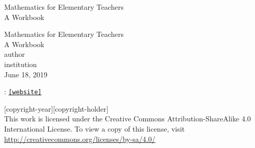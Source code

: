 \documentclass[twoside,11pt,]{book}
\newcommand{\mono}[1]{\texttt{#1}}
\begin{document}
\frontmatter
\thispagestyle{empty}
{\centering
\vspace*{0.28\textheight}
{\Huge Mathematics for Elementary Teachers}\\[2\baselineskip]
{\LARGE A Workbook}\\
}
\clearpage
\thispagestyle{empty}
\null%
\clearpage
\thispagestyle{empty}
{\centering
\vspace*{0.14\textheight}
{\Huge Mathematics for Elementary Teachers}\\[\baselineskip]
{\LARGE A Workbook}\\[3\baselineskip]
{\Large \textbraceleft{}author\textbraceright{}}\\[0.5\baselineskip]
{\Large \textbraceleft{}institution\textbraceright{}}\\[3\baselineskip]
{\Large June 18, 2019}\\}
\clearpage
\thispagestyle{empty}
\hypertarget{colophon-1054066218384}{}
: \href{[website]}{\mono{[website]}}\par\medskip
\noindent\textcopyright{}[copyright-year]\quad{}[copyright-holder]\\[0.5\baselineskip]
 This work is licensed under the Creative Commons Attribution-ShareAlike 4.0 International License. To view a copy of this license, visit \href{http://creativecommons.org/licenses/by-sa/4.0/}{http:\slash{}\slash{}creativecommons.org\slash{}licenses\slash{}by-sa\slash{}4.0\slash{}}\par\medskip
{}
\null\clearpage
\setcounter{tocdepth}{2}
\renewcommand*\contentsname{Contents}
\tableofcontents
\mainmatter
%
%
\typeout{************************************************}
\typeout{************************************************}
%
\end{document}
